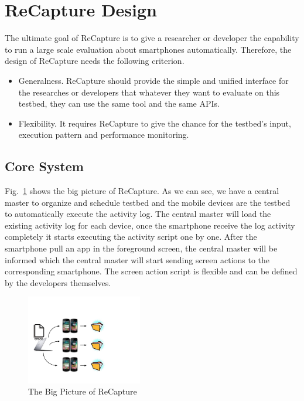 \section{ReCapture Design}\label{sec:design}
The ultimate goal of ReCapture is to give a researcher or developer the capability to run a large scale evaluation about smartphones automatically. Therefore, the design of ReCapture needs the following criterion.
\begin{itemize}
\item Generalness. ReCapture should provide the simple and unified interface for the researches or developers that whatever they want to evaluate on this testbed, they can use the same tool and the same APIs.
\item Flexibility. It requires ReCapture to give the chance for the testbed's input, execution pattern and performance monitoring.
\end{itemize}

\subsection{Core System}
Fig.~\ref{fig:big} shows the big picture of ReCapture. As we can see, we have a central master to organize and schedule testbed and the mobile devices are the testbed to automatically execute the activity log. The central master will load the existing activity log for each device, once the smartphone receive the log activity completely it starts executing the activity script one by one. After the smartphone pull an app in the foreground screen, the central master will be informed which the central master will start sending screen actions to the corresponding smartphone. The screen action script is flexible and can be defined by the developers themselves.

\begin{figure}
\centering
\includegraphics[width=0.45\textwidth]{figures/big-picture.pdf}
\caption{The Big Picture of ReCapture}
\label{fig:big}
\end{figure}

